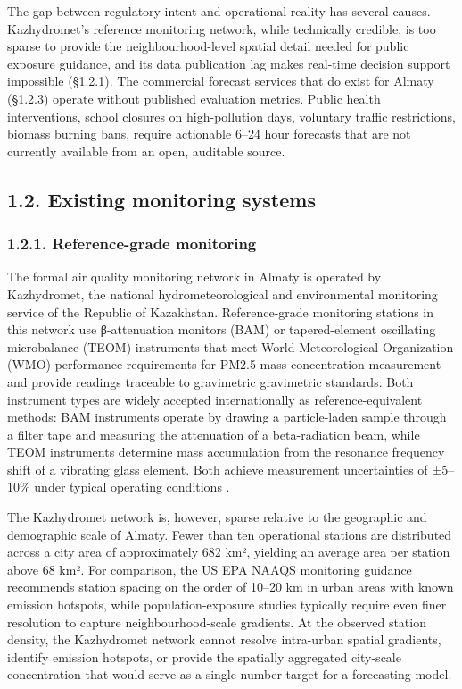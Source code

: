 The gap between regulatory intent and operational reality has several causes. Kazhydromet's reference monitoring network, while technically credible, is too sparse to provide the neighbourhood-level spatial detail needed for public exposure guidance, and its data publication lag makes real-time decision support impossible (§1.2.1). The commercial forecast services that do exist for Almaty (§1.2.3) operate without published evaluation metrics. Public health interventions, school closures on high-pollution days, voluntary traffic restrictions, biomass burning bans, require actionable 6--24 hour forecasts that are not currently available from an open, auditable source.

\subsection{1.2. Existing monitoring systems}\label{existing-monitoring-systems}

\subsubsection{1.2.1. Reference-grade monitoring}\label{reference-grade-monitoring}

The formal air quality monitoring network in Almaty is operated by Kazhydromet, the national hydrometeorological and environmental monitoring service of the Republic of Kazakhstan. Reference-grade monitoring stations in this network use β-attenuation monitors (BAM) or tapered-element oscillating microbalance (TEOM) instruments that meet World Meteorological Organization (WMO) performance requirements for PM2.5 mass concentration measurement and provide readings traceable to gravimetric gravimetric standards. Both instrument types are widely accepted internationally as reference-equivalent methods: BAM instruments operate by drawing a particle-laden sample through a filter tape and measuring the attenuation of a beta-radiation beam, while TEOM instruments determine mass accumulation from the resonance frequency shift of a vibrating glass element. Both achieve measurement uncertainties of ±5--10\% under typical operating conditions \cite{WMO2016GAW227}.

The Kazhydromet network is, however, sparse relative to the geographic and demographic scale of Almaty. Fewer than ten operational stations are distributed across a city area of approximately 682 km², yielding an average area per station above 68 km². For comparison, the US EPA NAAQS monitoring guidance recommends station spacing on the order of 10--20 km in urban areas with known emission hotspots, while population-exposure studies typically require even finer resolution to capture neighbourhood-scale gradients. At the observed station density, the Kazhydromet network cannot resolve intra-urban spatial gradients, identify emission hotspots, or provide the spatially aggregated city-scale concentration that would serve as a single-number target for a forecasting model.

